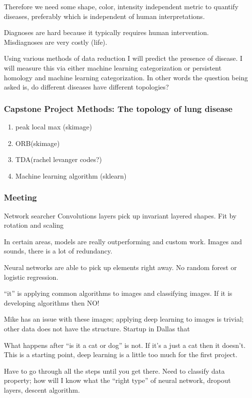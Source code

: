 Therefore we need some shape, color, intensity independent metric to quantify
diseases, preferably which is independent of human interpretations.

Diagnoses are hard because it typically requires human intervention.
Misdiagnoses are very costly (life).

Using various methods of data reduction I will predict the presence of disease.
I will measure this via either machine learning categorization or persistent homology
and machine learning categorization. In other words the question being asked is,
do different diseases have different topologies?
\subsubsection{Capstone Project Methods: The topology of lung disease}
\begin{enumerate}
\item peak local max (skimage)
\item ORB(skimage)
\item TDA(rachel levanger codes?)
\item Machine learning algorithm (sklearn)
\end{enumerate}


\subsubsection{Meeting}
Network searcher
Convolutions layers pick up invariant layered shapes.
Fit by rotation and scaling

In certain areas, models are really outperforming and custom
work. Images and sounds, there is a lot of redundancy.

Neural networks are able to pick up elements right away.
No random forest or logistic regression.

``it'' is applying common algorithms to images and
classifying images. If it is developing algorithms then NO!

Mike has an issue with these images; applying deep learning
to images is trivial; other data does not have the structure.
Startup in Dallas that

What happens after ``is it a cat or dog'' is not. If it's a just a cat then it doesn't.
This is a starting point, deep learning is a little too much for the first project.

Have to go through all the steps until you get there. Need to classify data property; how
will I know what the ``right type'' of neural network, dropout layers, descent algorithm.


